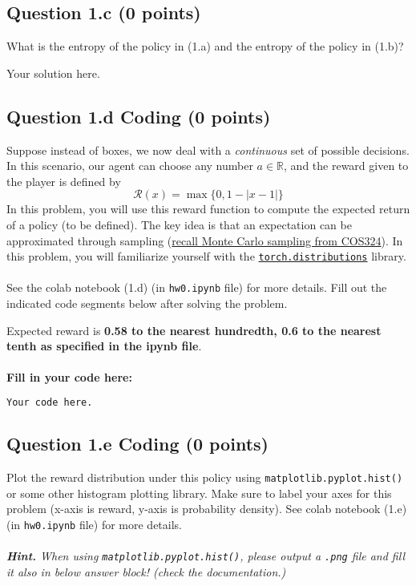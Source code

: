 \documentclass[12pt]{article}
\begin{document}
\subsection*{Question 1.c (0 points)}
What is the entropy of the policy in (1.a) and the entropy of the policy in (1.b)? 

\begin{solution}
Your solution here.
\end{solution}

\subsection*{Question 1.d \textbf{Coding} (0 points)}
Suppose instead of boxes, we now deal with a \textit{continuous} set of possible decisions. In this scenario, our agent can choose any number $a \in \mathbb{R}$, and the reward given to the player is defined by
$$
    \mathcal{R}(x) = \max \biggr \{ 0, 1 - |x - 1| \biggr\}
$$
In this problem, you will use this reward function to compute the expected return of a policy (to be 
defined). The key idea is that an expectation can be approximated through sampling (\href{https://princeton-introml.github.io/files/ch15.pdf}{recall Monte Carlo sampling from COS324}). In this problem, you will familiarize yourself with the \href{https://pytorch.org/docs/stable/distributions.html}{\texttt{torch.distributions}} library.
\\\\
See the colab notebook (1.d) (in \texttt{hw0.ipynb} file) for more details. Fill 
out the indicated code segments below after solving 
the problem.

\begin{solution}
Expected reward is \textbf{0.58 to the nearest hundredth, 0.6 to the nearest tenth as specified in the ipynb file}. 
\\\\
\textbf{Fill in your code here:}
\begin{lstlisting}[language=Python]
Your code here.
\end{lstlisting}
\end{solution}

\newpage
\subsection*{Question 1.e \textbf{Coding} (0 points)}
Plot the reward distribution under this policy using \texttt{matplotlib.pyplot.hist()} or some other histogram plotting library. Make sure to label your axes for this problem (x-axis is reward, y-axis is probability density). See colab notebook (1.e) (in \texttt{hw0.ipynb} file) for more details.
\\\\
\textit{\textbf{Hint.} When using \texttt{matplotlib.pyplot.hist()}, please output a \texttt{.png} file and fill it also in below answer block! (check the documentation.)}
\end{document}
